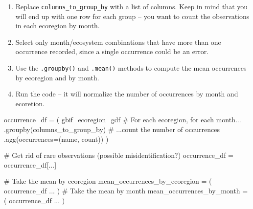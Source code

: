 \documentclass[
  letterpaper,
  DIV=11,
  numbers=noendperiod,
  oneside]{scrreprt}
\newenvironment{Shaded}{\begin{snugshade}}{\end{snugshade}}
\newcommand{\CommentTok}[1]{\textcolor[rgb]{0.37,0.37,0.37}{#1}}
\newcommand{\NormalTok}[1]{\textcolor[rgb]{0.00,0.23,0.31}{#1}}
\newcommand{\OperatorTok}[1]{\textcolor[rgb]{0.37,0.37,0.37}{#1}}
\newcommand{\StringTok}[1]{\textcolor[rgb]{0.13,0.47,0.30}{#1}}
\providecommand{\tightlist}{%
  \setlength{\itemsep}{0pt}\setlength{\parskip}{0pt}}
\begin{document}
\begin{tcolorbox}[enhanced jigsaw, colbacktitle=quarto-callout-color!10!white, opacityback=0, bottomtitle=1mm, toptitle=1mm, bottomrule=.15mm, left=2mm, colframe=quarto-callout-color-frame, leftrule=.75mm, opacitybacktitle=0.6, colback=white, rightrule=.15mm, toprule=.15mm, breakable, titlerule=0mm, title=\textcolor{quarto-callout-color}{\faInfo}\hspace{0.5em}{Try It: Group observations by ecoregion}, coltitle=black, arc=.35mm]

\begin{enumerate}
\def\labelenumi{\arabic{enumi}.}
\tightlist
\item
  Replace \texttt{columns\_to\_group\_by} with a list of columns. Keep
  in mind that you will end up with one row for each group -- you want
  to count the observations in each ecoregion by month.
\item
  Select only month/ecosystem combinations that have more than one
  occurrence recorded, since a single occurrence could be an error.
\item
  Use the \texttt{.groupby()} and \texttt{.mean()} methods to compute
  the mean occurrences by ecoregion and by month.
\item
  Run the code -- it will normalize the number of occurrences by month
  and ecoretion.
\end{enumerate}

\end{tcolorbox}

\begin{Shaded}
\begin{Highlighting}[]
\NormalTok{occurrence\_df }\OperatorTok{=}\NormalTok{ (}
\NormalTok{    gbif\_ecoregion\_gdf}
    \CommentTok{\# For each ecoregion, for each month...}
\NormalTok{    .groupby(columns\_to\_group\_by)}
    \CommentTok{\# ...count the number of occurrences}
\NormalTok{    .agg(occurrences}\OperatorTok{=}\NormalTok{(}\StringTok{\textquotesingle{}name\textquotesingle{}}\NormalTok{, }\StringTok{\textquotesingle{}count\textquotesingle{}}\NormalTok{))}
\NormalTok{)}

\CommentTok{\# Get rid of rare observations (possible misidentification?)}
\NormalTok{occurrence\_df }\OperatorTok{=}\NormalTok{ occurrence\_df[...]}

\CommentTok{\# Take the mean by ecoregion}
\NormalTok{mean\_occurrences\_by\_ecoregion }\OperatorTok{=}\NormalTok{ (}
\NormalTok{    occurrence\_df}
\NormalTok{    ...}
\NormalTok{)}
\CommentTok{\# Take the mean by month}
\NormalTok{mean\_occurrences\_by\_month }\OperatorTok{=}\NormalTok{ (}
\NormalTok{    occurrence\_df}
\NormalTok{    ...}
\NormalTok{)}
\end{Highlighting}
\end{Shaded}
\end{document}
